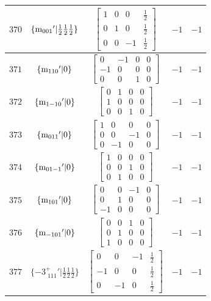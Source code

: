 \documentclass[fleqn,8pt]{jsarticle}
\begin{document}
\begin{longtable}{ccccc}
$ 370 $ & $ \{{\rm m}_{001}{}'|\frac{1}{2} \frac{1}{2} \frac{1}{2}\} $ & $ \begin{bmatrix} 1 & 0 & 0 & \frac{1}{2} \\ 0 & 1 & 0 & \frac{1}{2} \\ 0 & 0 & -1 & \frac{1}{2} \end{bmatrix} $ & $ -1 $ & $ -1 $ \\ \hline
$ 371 $ & $ \{{\rm m}_{110}{}'|0\} $ & $ \begin{bmatrix} 0 & -1 & 0 & 0 \\ -1 & 0 & 0 & 0 \\ 0 & 0 & 1 & 0 \end{bmatrix} $ & $ -1 $ & $ -1 $ \\ \hline
$ 372 $ & $ \{{\rm m}_{1-10}{}'|0\} $ & $ \begin{bmatrix} 0 & 1 & 0 & 0 \\ 1 & 0 & 0 & 0 \\ 0 & 0 & 1 & 0 \end{bmatrix} $ & $ -1 $ & $ -1 $ \\ \hline
$ 373 $ & $ \{{\rm m}_{011}{}'|0\} $ & $ \begin{bmatrix} 1 & 0 & 0 & 0 \\ 0 & 0 & -1 & 0 \\ 0 & -1 & 0 & 0 \end{bmatrix} $ & $ -1 $ & $ -1 $ \\ \hline
$ 374 $ & $ \{{\rm m}_{01-1}{}'|0\} $ & $ \begin{bmatrix} 1 & 0 & 0 & 0 \\ 0 & 0 & 1 & 0 \\ 0 & 1 & 0 & 0 \end{bmatrix} $ & $ -1 $ & $ -1 $ \\ \hline
$ 375 $ & $ \{{\rm m}_{101}{}'|0\} $ & $ \begin{bmatrix} 0 & 0 & -1 & 0 \\ 0 & 1 & 0 & 0 \\ -1 & 0 & 0 & 0 \end{bmatrix} $ & $ -1 $ & $ -1 $ \\ \hline
$ 376 $ & $ \{{\rm m}_{-101}{}'|0\} $ & $ \begin{bmatrix} 0 & 0 & 1 & 0 \\ 0 & 1 & 0 & 0 \\ 1 & 0 & 0 & 0 \end{bmatrix} $ & $ -1 $ & $ -1 $ \\ \hline
$ 377 $ & $ \{-3^{+}_{\,\,111}{}'|\frac{1}{2} \frac{1}{2} \frac{1}{2}\} $ & $ \begin{bmatrix} 0 & 0 & -1 & \frac{1}{2} \\ -1 & 0 & 0 & \frac{1}{2} \\ 0 & -1 & 0 & \frac{1}{2} \end{bmatrix} $ & $ -1 $ & $ -1 $ \\ \hline

\end{longtable}
\end{document}
